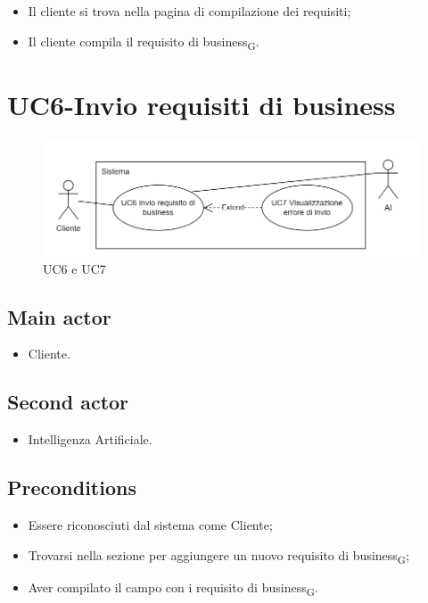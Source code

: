 \documentclass{article}
\begin{document}
        \begin{itemize}
            \item Il cliente si trova nella pagina di compilazione dei requisiti;
            \item Il cliente compila il requisito di business\textsubscript{G}.
        \end{itemize}
    
\section{UC6-Invio requisiti di business}
    \begin{figure}[H]
      \centering
      \includegraphics[width=.8\textwidth, height=.6\textheight, keepaspectratio]{./imgUML/UC6-INVIO-REQUISITO-DI-BUSINESS.png}
            \caption{UC6 e UC7}
      \label{fig:UC6-INVIO-REQUISITO-DI-BUSINESS}
    \end{figure}
     \subsection*{Main actor}
     \begin{itemize}
         \item Cliente.
     \end{itemize}
      \subsection*{Second actor}
     \begin{itemize}
         \item Intelligenza Artificiale.
     \end{itemize}
     \subsection*{Preconditions} 
     \begin{itemize}
         \item Essere riconosciuti dal sistema come Cliente;
         \item Trovarsi nella sezione per aggiungere un nuovo requisito di business\textsubscript{G};
         \item Aver compilato il campo con i requisito di business\textsubscript{G}.
     \end{itemize}
\end{document}
